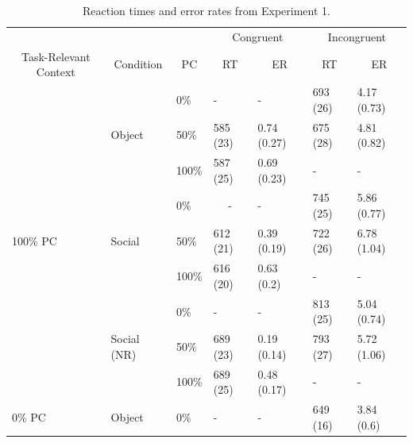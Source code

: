 \documentclass[]{DissertateCUNY}
\begin{document}
\begin{table}[htbp]
\caption{Reaction times and error rates from Experiment 1.}
\label{TR_table}
\centering
\begin{tabular}{lllcccc}
\toprule
 & & & \multicolumn{2}{c}{Congruent} & \multicolumn{2}{c}{Incongruent} \\
\cmidrule(rl){4-5}
\cmidrule(rl){6-7}
\multicolumn{1}{c}{Task-Relevant Context} & \multicolumn{1}{c}{Condition} & \multicolumn{1}{c}{PC} & \multicolumn{1}{c}{RT} & \multicolumn{1}{c}{ER} & \multicolumn{1}{c}{RT} & \multicolumn{1}{c}{ER}  \\
\midrule
\multirow{9}{*}{100\% PC} & \multirow{3}{*}{Object} & \multicolumn{1}{l}{0\%} & \multicolumn{1}{l}{-} & \multicolumn{1}{l}{-} & \multicolumn{1}{l}{693 (26)} & \multicolumn{1}{l}{4.17 (0.73)} \\
& & \multicolumn{1}{l}{50\%} & \multicolumn{1}{l}{585 (23)} & \multicolumn{1}{l}{0.74 (0.27)} & \multicolumn{1}{l}{675 (28)} & \multicolumn{1}{l}{4.81 (0.82)} \\
& & \multicolumn{1}{l}{100\%} & \multicolumn{1}{l}{587 (25)} & \multicolumn{1}{l}{0.69 (0.23)} & \multicolumn{1}{l}{-} & \multicolumn{1}{l}{-} \\
\cmidrule(rl){2-7}
& \multirow{3}{*}{Social} & \multicolumn{1}{l}{0\%} & \multicolumn{1}{c}{-} & \multicolumn{1}{l}{-} & \multicolumn{1}{l}{745 (25)} & \multicolumn{1}{l}{5.86 (0.77)} \\
& & \multicolumn{1}{l}{50\%} & \multicolumn{1}{l}{612 (21)} & \multicolumn{1}{l}{0.39 (0.19)} & \multicolumn{1}{l}{722 (26)} & \multicolumn{1}{l}{6.78 (1.04)} \\
& & \multicolumn{1}{l}{100\%} & \multicolumn{1}{l}{616 (20)} & \multicolumn{1}{l}{0.63 (0.2)} & \multicolumn{1}{l}{-} & \multicolumn{1}{l}{-} \\
\cmidrule(rl){2-7}
& \multirow{3}{*}{Social (NR)} & \multicolumn{1}{l}{0\%} & \multicolumn{1}{l}{-} & \multicolumn{1}{l}{-} & \multicolumn{1}{l}{813 (25)} & \multicolumn{1}{l}{5.04 (0.74)} \\
& & \multicolumn{1}{l}{50\%} & \multicolumn{1}{l}{689 (23)} & \multicolumn{1}{l}{0.19 (0.14)} & \multicolumn{1}{l}{793 (27)} & \multicolumn{1}{l}{5.72 (1.06)} \\
& & \multicolumn{1}{l}{100\%} & \multicolumn{1}{l}{689 (25)} & \multicolumn{1}{l}{0.48 (0.17)} & \multicolumn{1}{l}{-} & \multicolumn{1}{l}{-} \\
\midrule
\multirow{9}{*}{0\% PC} & \multirow{3}{*}{Object} & \multicolumn{1}{l}{0\%} & \multicolumn{1}{l}{-} & \multicolumn{1}{l}{-} & \multicolumn{1}{l}{649 (16)} & \multicolumn{1}{l}{3.84 (0.6)} \\

\end{tabular}
\end{table}
\end{document}
